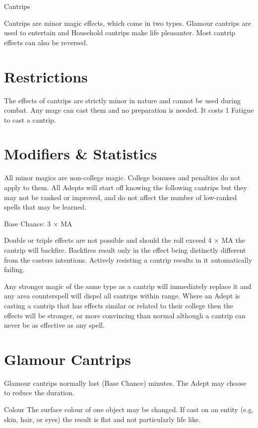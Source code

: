 \begin{Chapter}{Cantrips}

Cantrips are minor magic effects, which come in two types.  Glamour
cantrips are used to entertain and Household cantrips make life
pleasanter. Most cantrip effects can also be reversed.


\section{Restrictions}

The effects of cantrips are strictly minor in nature and cannot be
used during combat.  Any mage can cast them and no preparation is
needed.  It costs 1 Fatigue to cast a cantrip.


\section{Modifiers \& Statistics}

All minor magics are non-college magic.  College bonuses and penalties
do not apply to them.  All Adepts will start off knowing the following
cantrips but they may not be ranked or improved, and do not affect the
number of low-ranked spells that may be learned.

Base Chance: 3 × MA 

Double or triple effects are not possible and should the roll exceed 4
× MA the cantrip will backfire.  Backfires result only in the effect
being distinctly different from the casters intentions.  Actively
resisting a cantrip results in it automatically failing.

Any stronger magic of the same type as a cantrip will immediately
replace it and any area counterspell will dispel all cantrips within
range. Where an Adept is casting a cantrip that has effects similar or
related to their college then the effects will be stronger, or more
convincing than normal although a cantrip can never be as effective as
any spell.


\section{Glamour Cantrips}

Glamour cantrips normally last (Base Chance) minutes.  The Adept may
choose to reduce the duration.

\begin{Description}

\item[Colour] The surface colour of one object may be changed.  If
  cast on an entity (e.g.  skin, hair, or eyes) the result is flat and
  not particularly life like.


\end{Description}
\end{Chapter}

